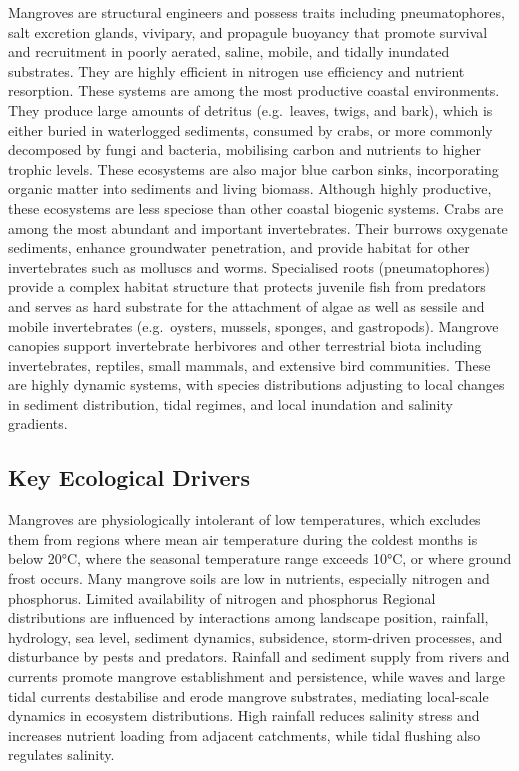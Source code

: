 \documentclass[
  letterpaper,
  DIV=11,
  numbers=noendperiod]{scrartcl}
\begin{document}
Mangroves are structural engineers and possess traits including
pneumatophores, salt excretion glands, vivipary, and propagule buoyancy
that promote survival and recruitment in poorly aerated, saline, mobile,
and tidally inundated substrates. They are highly efficient in nitrogen
use efficiency and nutrient resorption. These systems are among the most
productive coastal environments. They produce large amounts of detritus
(e.g.~leaves, twigs, and bark), which is either buried in waterlogged
sediments, consumed by crabs, or more commonly decomposed by fungi and
bacteria, mobilising carbon and nutrients to higher trophic levels.
These ecosystems are also major blue carbon sinks, incorporating organic
matter into sediments and living biomass. Although highly productive,
these ecosystems are less speciose than other coastal biogenic systems.
Crabs are among the most abundant and important invertebrates. Their
burrows oxygenate sediments, enhance groundwater penetration, and
provide habitat for other invertebrates such as molluscs and worms.
Specialised roots (pneumatophores) provide a complex habitat structure
that protects juvenile fish from predators and serves as hard substrate
for the attachment of algae as well as sessile and mobile invertebrates
(e.g.~oysters, mussels, sponges, and gastropods). Mangrove canopies
support invertebrate herbivores and other terrestrial biota including
invertebrates, reptiles, small mammals, and extensive bird communities.
These are highly dynamic systems, with species distributions adjusting
to local changes in sediment distribution, tidal regimes, and local
inundation and salinity gradients.

\subsection{Key Ecological Drivers}\label{key-ecological-drivers-50}

Mangroves are physiologically intolerant of low temperatures, which
excludes them from regions where mean air temperature during the coldest
months is below 20°C, where the seasonal temperature range exceeds 10°C,
or where ground frost occurs. Many mangrove soils are low in nutrients,
especially nitrogen and phosphorus. Limited availability of nitrogen and
phosphorus Regional distributions are influenced by interactions among
landscape position, rainfall, hydrology, sea level, sediment dynamics,
subsidence, storm-driven processes, and disturbance by pests and
predators. Rainfall and sediment supply from rivers and currents promote
mangrove establishment and persistence, while waves and large tidal
currents destabilise and erode mangrove substrates, mediating
local-scale dynamics in ecosystem distributions. High rainfall reduces
salinity stress and increases nutrient loading from adjacent catchments,
while tidal flushing also regulates salinity.
\end{document}
